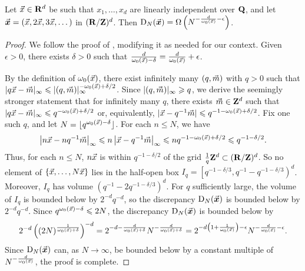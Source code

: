 \begin{theorem}\label{thm:disc-lower-bound}
Let $\vec{x}\in \mathbf{R}^d$ be such that $x_1,\dots,x_d$ are linearly independent over 
$\mathbf{Q}$, and let $\vec{\boldsymbol x}=(\vec{x},2\vec{x},3\vec{x},\dots)$ in $(\mathbf{R}/\mathbf{Z})^d$. Then 
$\operatorname{D}_N(\vec{\boldsymbol x}) = \Omega\left(N^{-\frac{d}{\omega_0(\vec{x})}-\epsilon} \right)$. 
\end{theorem}
\begin{proof}
We follow the proof of \cite[Ch.~2, Th.~3.3]{kuipers-niederreiter-1974}, 
modifying it as needed for our context. Given $\epsilon>0$, there exists 
$\delta>0$ such that 
$\frac{d}{\omega_0(\vec{x})-\delta} = \frac{d}{\omega_0(\vec{x})} + \epsilon$. 

By the definition of $\omega_0(\vec{x})$, there exist infinitely many 
$(q,\vec{m})$ with $q>0$ such that 
$|q \vec{x} - \vec{m}|_\infty \leqslant |(q,\vec{m})|_\infty^{-\omega_0(\vec{x})+\delta/2}$. 
Since $|(q,\vec{m})|_\infty \geqslant q$, we derive the seemingly stronger 
statement that for infinitely many $q$, there exists 
$\vec{m}\in \mathbf{Z}^d$ such that 
$|q \vec{x}-\vec{m}|_\infty \leqslant q^{-\omega_0(\vec{x})+\delta/2}$ or, equivalently, 
$|\vec{x}-q^{-1}\vec{m}| \leqslant q^{-1-\omega_0(\vec{x})+\delta/2}$. Fix one such $q$, 
and let $N=\lfloor q^{\omega_0(\vec{x})-\delta}\rfloor$. For each $n\leqslant N$, 
we have 
\[
	\left|n \vec{x} - n q^{-1} \vec{m}\right|_\infty 
		\leqslant n \left|\vec{x} - q^{-1} \vec{m}\right|_\infty
		\leqslant n q^{-1-\omega_0(\vec{x})+\delta/2}
		\leqslant q^{-1-\delta/2}. 
\]
Thus, for each $n\leqslant N$, $n \vec{x}$ is within $q^{-1-\delta/2}$ of the 
grid $\frac 1 q \mathbf{Z}^d\subset (\mathbf{R}/\mathbf{Z})^d$. So no element of 
$\{\vec{x},\dots,N \vec{x}\}$ lies in the half-open box 
$I_q = \left[ q^{-1 - \delta / 3}, q^{-1} - q^{-1 - \delta / 3}\right)^d$. 
Moreover, $I_q$ has volume $\left(q^{-1} - 2q^{-1 - \delta / 3}\right)^d$. 
For $q$ sufficiently large, the volume of $I_q$ is bounded below by 
$2^{-d} q^{-d}$, so the discrepancy $\operatorname{D}_N(\vec{\boldsymbol x})$ is 
bounded below by $2^{-d} q^{-d}$. Since $q^{\omega_0(\vec{x})-\delta} \leqslant 2 N$, 
the discrepancy $\operatorname{D}_N(\vec{\boldsymbol x})$ is bounded below by 
\[
	2^{-d} \left( (2 N)^{\frac{1}{\omega_0(\vec{x})+\delta}}\right)^{-d} 
		= 2^{-d-\frac{d}{\omega_0(\vec{x})+\delta}} N^{-\frac{d}{\omega_0(\vec{x})+\delta}}
		= 2^{-d\left(1+\frac{1}{\omega_0(\vec{x})}\right)-\epsilon} N^{-\frac{d}{\omega_0(\vec{x})}-\epsilon} .
\]
Since $\operatorname{D}_N(\vec{\boldsymbol x})$ can, as $N\to \infty$, be bounded below by a constant 
multiple of $N^{-\frac{d}{\omega_0(\vec{x})}}$, the proof is complete.
\end{proof}







